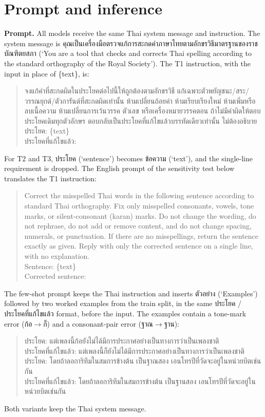 \documentclass[11pt]{article}
\begin{document}
\section{Prompt and inference}
\label{app:prompt}
\textbf{Prompt.} All models receive the same Thai system message and instruction. The system
message is คุณเป็นเครื่องมือตรวจแก้การสะกดคำภาษาไทยตามอักขรวิธีมาตรฐานของราชบัณฑิตยสภา (`You are
a tool that checks and corrects Thai spelling according to the standard orthography of the Royal
Society'). The T1 instruction, with the input in place of \{text\}, is:
\begin{quote}\small\raggedright
จงแก้คำที่สะกดผิดในประโยคต่อไปนี้ให้ถูกต้องตามอักขรวิธี แก้เฉพาะตัวพยัญชนะ/สระ/วรรณยุกต์/ตัวการันต์ที่สะกดผิดเท่านั้น
ห้ามเปลี่ยนถ้อยคำ ห้ามเรียบเรียงใหม่ ห้ามเพิ่มหรือลบเนื้อความ ห้ามเปลี่ยนการเว้นวรรค ตัวเลข
หรือเครื่องหมายวรรคตอน ถ้าไม่มีคำผิดให้ตอบประโยคเดิมทุกตัวอักษร
ตอบกลับเป็นประโยคที่แก้ไขแล้วบรรทัดเดียวเท่านั้น ไม่ต้องอธิบาย\\[3pt]
ประโยค: \{text\}\\
ประโยคที่แก้ไขแล้ว:
\end{quote}
For T2 and T3, ประโยค (`sentence') becomes ข้อความ (`text'), and the single-line requirement is
dropped. The English prompt of the sensitivity test below translates the T1 instruction:
\begin{quote}\small\raggedright
Correct the misspelled Thai words in the following sentence according to standard Thai
orthography. Fix only misspelled consonants, vowels, tone marks, or silent-consonant (karan)
marks. Do not change the wording, do not rephrase, do not add or remove content, and do not
change spacing, numerals, or punctuation. If there are no misspellings, return the sentence
exactly as given. Reply with only the corrected sentence on a single line, with no
explanation.\\[3pt]
Sentence: \{text\}\\
Corrected sentence:
\end{quote}
The few-shot prompt keeps the Thai instruction and inserts ตัวอย่าง (`Examples') followed by two
worked examples from the train split, in the same ประโยค / ประโยคที่แก้ไขแล้ว format, before the
input. The examples contain a tone-mark error (ก้อ$\to$ก็) and a consonant-pair error
(ฐาณ$\to$ฐาน):
\begin{quote}\small\raggedright
ประโยค: แต่เพลงนี้ก้อยังไม่ได้มีการประกาศอย่างเป็นทางการว่าเป็นเพลงชาติ\\
ประโยคที่แก้ไขแล้ว: แต่เพลงนี้ก็ยังไม่ได้มีการประกาศอย่างเป็นทางการว่าเป็นเพลงชาติ\\[3pt]
ประโยค: โดยถ้าลอการิทึมในสมการข้างต้น เป็นฐาณสอง เอนโทรปีที่วัดจะอยู่ในหน่วยบิตเช่นกัน\\
ประโยคที่แก้ไขแล้ว: โดยถ้าลอการิทึมในสมการข้างต้น เป็นฐานสอง เอนโทรปีที่วัดจะอยู่ในหน่วยบิตเช่นกัน
\end{quote}
Both variants keep the Thai system message.
\end{document}
